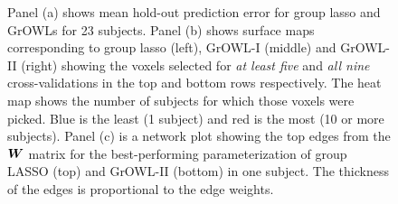 
\begin{figure}[!h]
\centering
{}
\hfil
{}
\hfill
{}
\caption{Panel (a) shows mean hold-out prediction error for group lasso and GrOWLs for 23 subjects. Panel (b) shows surface maps corresponding to group lasso (left), GrOWL-I (middle) and GrOWL-II (right) showing the voxels selected for \textit{at least five} and \textit{all nine} cross-validations in the top and bottom rows respectively. The heat map shows the number of subjects for which those voxels were picked. Blue is the least (1 subject) and red is the most (10 or more subjects). Panel (c) is a network plot showing the top edges from the $\boldsymbol{W}$ matrix for the best-performing parameterization of group LASSO (top) and GrOWL-II (bottom) in one subject. The thickness of the edges is proportional to the edge weights.}
\label{fig.error}
\end{figure}

